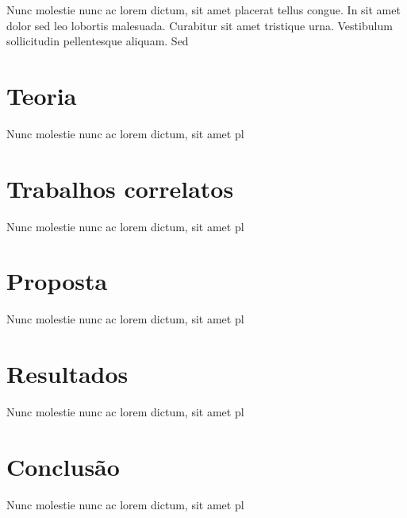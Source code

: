 \documentclass[rascunho,xindy,sublist]{fei}
\begin{document}
Nunc molestie nunc ac lorem dictum, sit amet placerat tellus congue. In sit amet dolor sed leo lobortis malesuada. Curabitur sit amet tristique urna. Vestibulum sollicitudin pellentesque aliquam. Sed 

\chapter{Teoria}

Nunc molestie nunc ac lorem dictum, sit amet pl

\chapter{Trabalhos correlatos}

Nunc molestie nunc ac lorem dictum, sit amet pl

\chapter{Proposta}

Nunc molestie nunc ac lorem dictum, sit amet pl

\chapter{Resultados}

Nunc molestie nunc ac lorem dictum, sit amet pl

\chapter{Conclusão}

Nunc molestie nunc ac lorem dictum, sit amet pl

\printbibliography

\printindex
\end{document}
